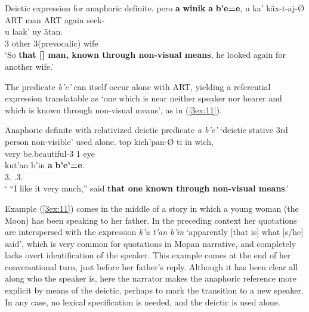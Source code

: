 \documentclass[output=paper]{langsci/langscibook}
\begin{document}
\begin{samepage}
\begin{exe}
\ex\label{3ex:10}
Deictic expression for anaphoric definite. 
\exi{}
\gll	pero 		{\bf{a}} 	{\bf{winik}}		{\bf{a}} 	{\bf{b'e=e}}, 			u 		ka'		k\"ax-t-aj-\O \\
	{}	ART	man	ART	{}		{}	again	seek-{} \\
\glt
\exi{}
\gll	u 		laak' 		uy					\"atan. \\
	3{}	other		3{}(prevocalic)		wife \\
\glt	`So {\bf{that [{}] man, known through non-visual means}}, he looked again for another wife.'
\end{exe}
\end{samepage}

The predicate {\emph{b'e'}} can itself occur alone with ART, yielding a referential expression translatable as `one which is near neither speaker nor hearer and which is known through non-visual means', as in (\ref{3ex:11}).

\begin{exe}
\ex\label{3ex:11}
Anaphoric definite with relativized deictic predicate {\emph{a b'e'}} `deictic stative 3rd person non-visible' used alone. 
\exi{}
\gll	top 		kich'pan-{\O} 			ti			in 		wich, \\
	very		be.beautiful-3{}		{}		1{}	eye \\
\glt
\exi{}
\gll	kut'an		b'in	 	{\bf{a}} 	{\bf{b'e'=e}}. \\
	3.{}	{}	{}	{}.3.{} \\
\glt	` ``I like it very much,'' said {\bf{that one known through non-visual means}}.'
\end{exe}

Example (\ref{3ex:11}) comes in the middle of a story in which a young woman (the Moon) has been speaking to her father.  In the preceding context her quotations are interspersed with the expression {\emph{k'u t'an b'in}} `apparently [that is] what [s/he] said', which is very common for quotations in Mopan narrative, and completely lacks overt identification of the speaker.  This example comes at the end of her conversational turn, just before her father's reply.  Although it has been clear all along who the speaker is, here the narrator makes the anaphoric reference more explicit by means of the deictic, perhaps to mark the transition to a new speaker.  In any case, no lexical specification is needed, and the deictic is used alone. 
\end{document}
